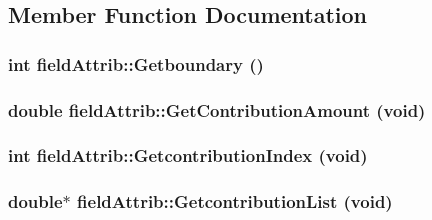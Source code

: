 \subsection{Member Function Documentation}
\hypertarget{classfield_attrib_af6bdce2faa2b4bd3659fbc767062a750}{
\subsubsection[{Getboundary}]{\setlength{\rightskip}{0pt plus 5cm}int fieldAttrib::Getboundary ()}}
\label{classfield_attrib_af6bdce2faa2b4bd3659fbc767062a750}
\hypertarget{classfield_attrib_abbf1653e171389eee4236612443e63b6}{
\subsubsection[{GetContributionAmount}]{\setlength{\rightskip}{0pt plus 5cm}double fieldAttrib::GetContributionAmount (void)}}
\label{classfield_attrib_abbf1653e171389eee4236612443e63b6}
\hypertarget{classfield_attrib_ae2bd2af2884f9efe7054bd22054d9419}{
\subsubsection[{GetcontributionIndex}]{\setlength{\rightskip}{0pt plus 5cm}int fieldAttrib::GetcontributionIndex (void)}}
\label{classfield_attrib_ae2bd2af2884f9efe7054bd22054d9419}
\hypertarget{classfield_attrib_afab6e6148d727d1ce35e1368c3cb08c3}{
\subsubsection[{GetcontributionList}]{\setlength{\rightskip}{0pt plus 5cm}double$\ast$ fieldAttrib::GetcontributionList (void)}}
